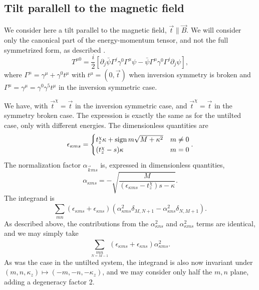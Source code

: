 \subsection{Tilt parallell to the magnetic field}
We consider here a tilt parallel to the magnetic field, \( \vec{t} \parallel \vec{B} \). We will consider only the canonical part of the energy-momentum tensor, and not the full symmetrized form, as described \citeauthor{vanderwurffMagnetovorticalThermoelectricTransport2019} \cite{vanderwurffMagnetovorticalThermoelectricTransport2019}.
\begin{equation}
  \label{eq:103}
  T^{\mu 0} = \frac{i}{2}
  [
  \partial_j \bar{\psi} \Gamma ^j \gamma ^0 \Gamma ^{\mu } \psi - \bar{\psi} \Gamma ^{\mu } \gamma ^0 \Gamma ^j \partial _j \psi
  ],
\end{equation}
where \( \Gamma ^{\mu } = \gamma ^{\mu } + \gamma ^0 t^{\mu } \) with \( t^{\mu } = (0, \vec{t}) \) when inversion symmetry is broken and \( \Gamma ^{\mu }= \gamma ^{\mu } = \gamma ^0 \gamma ^5 t^{\mu } \) in the inversion symmetric case.

We have, with \( \vec{t}^{\chi } = \vec{t} \) in the inversion symmetric case, and \( \vec{t}^{\chi } = \vec{t} \) in the symmetry broken case.
The expression is exactly the same as for the untilted case, only with different energies.
The dimensionless quantities are
\begin{equation}
  \label{eq:104}
  \epsilon_{\kappa m s} =
  \begin{cases}
    t_z^{\chi } \kappa + \operatorname{sign}{m} \sqrt{M + \kappa ^2} & m \neq 0\\
    (t_z^{\chi } - s) \kappa & m = 0
  \end{cases}.
\end{equation}
The normalization factor \( \alpha _{\vec{k} m s} \) is, expressed in dimensionless quantities,
\begin{equation}
  \label{eq:105}
  \alpha _{\kappa m s} =
  -\sqrt{\frac{M}{(\epsilon_{\kappa  m s} - t_{z}^{\chi })s - \kappa }}.
\end{equation}
The integrand is
\begin{equation}
  \label{eq:106}
  \sum\limits_{mn}^{}
  (\epsilon_{\kappa m s} + \epsilon_{\kappa n s}) (\alpha_{\kappa m s}^2 \delta_{M, N+1} - \alpha_{\kappa n s}^2 \delta _{N, M+1}).
\end{equation}
As described above, the contributions from the \( \alpha _{\kappa n s}^2  \) and \( \alpha _{\kappa m s}^2 \) terms are identical, and we may simply take
\begin{equation}
  \label{eq:107}
  \sum\limits_{\underset{N=M-1}{mn}}^{}
  (\epsilon_{\kappa m s} + \epsilon_{\kappa n s}) \alpha_{\kappa m s}^2.
\end{equation}
As was the case in the untilted system, the integrand is also now invariant under \( (m, n, \kappa_z) \mapsto (-m, -n, -\kappa_z) \), and we may consider only half the \( m,n \) plane, adding a degeneracy factor 2.

